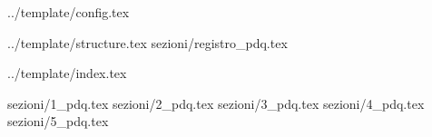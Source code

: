  {../template/config.tex}


\def\DOCUMENTO{Piano di Qualifica}
\def\VERSIONE{1.0.0}

\def\DESCRIZIONE{<Info documento>}

\def\REDATTORE {Federico Rossetto}
\def\VERIFICATORE {Riccardo Rizzo}
\def\RESPONSABILE {Enrico Chiara}

\def\USO {Esterno}

\def\DISTRIBUZIONE {\GRUPPO{}\\ & \COMMITTENTE{}\\}

\def\DESCRIZIONE {Documento riguardante l'insieme di strategie di verifica adottate dal gruppo 
Stark Labs per il conseguimento di requisiti qualitativi per il progetto SiVoDiM}
 {../template/structure.tex}
 {sezioni/registro_pdq.tex}

\def\INDICE	{true}
\def\TABELLE {true}
\def\FIGURE {true}


 {../template/index.tex}

 {sezioni/1_pdq.tex}
 {sezioni/2_pdq.tex}
 {sezioni/3_pdq.tex}
 {sezioni/4_pdq.tex}
 {sezioni/5_pdq.tex}





